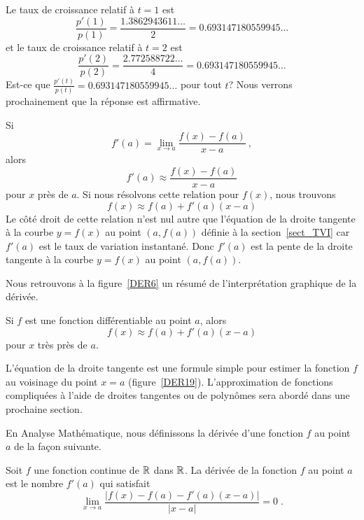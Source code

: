 {\begin{egg}
Le taux de croissance relatif à $t=1$ est
\[
\frac{p'(1)}{p(1)} = \frac{1.3862943611\ldots}{2}
= 0.693147180559945\ldots
\]
et le taux de croissance relatif à $t=2$ est
\[
\frac{p'(2)}{p(2)} = \frac{2.772588722\ldots}{4}
= 0.693147180559945\ldots
\]
Est-ce que $\displaystyle \frac{p'(t)}{p(t)} = 0.693147180559945\ldots$
pour tout $t$?  Nous verrons prochainement que la réponse est affirmative.
\end{egg}

Si
\[
f'(a) = \lim_{x\rightarrow a} \frac{f(x) - f(a)}{x-a} \ ,
\]
alors
\[
f'(a) \approx \frac{f(x) - f(a)}{x-a}
\]
pour $x$ près de $a$.  Si nous résolvons cette relation pour $f(x)$,
nous trouvons
\begin{equation} \label{faedt}
f(x) \approx f(a) + f'(a) (x-a)
\end{equation}
Le côté droit de cette relation n'est nul autre que l'équation de la
droite tangente à la courbe $y=f(x)$ au point $(a,f(a))$ définie à la
section~\ref{sect_TVI} car $f'(a)$ est le taux de variation
instantané.  Donc $f'(a)$ est la pente de la droite tangente à la
courbe $y=f(x)$ au point $(a,f(a))$.

Nous retrouvons à la figure~\ref{DER6} un résumé de l'interprétation
graphique de la dérivée.


\begin{focus}{\prp} \label{der_approx_ft}
Si $f$ est une fonction différentiable au point $a$, alors
\[
f(x) \approx f(a) + f'(a) (x-a)
\]
pour $x$ très près de $a$.
\end{focus}

L'équation de la droite tangente est une formule simple pour estimer
la fonction $f$ au voisinage du point $x=a$ (figure~\ref{DER19}).
L'approximation de fonctions compliquées à l'aide
de droites tangentes ou de polynômes sera abordé dans une prochaine
section.

\begin{rmk}[\theory]
En Analyse Mathématique, nous définissons la dérivée d'une fonction $f$ au
point $a$ de la façon suivante.

\begin{focus}{\dfn}
Soit $f$ une fonction continue de $\mathbb{R}$ dans $\mathbb{R}$.  La dérivée de la
fonction $f$ au point $a$ est le nombre $f'(a)$ qui satisfait
\begin{equation} \label{RigDfn}
\lim_{x\rightarrow a} \frac{|f(x) - f(a) - f'(a)(x-a)|}{|x-a|} = 0 \; .
\end{equation}
\end{focus}


\end{rmk}}
